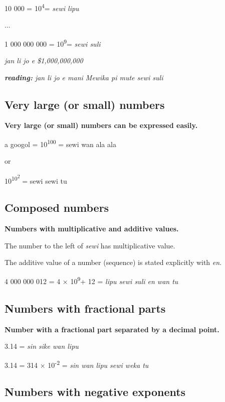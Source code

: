 \documentclass{article}
\begin{document}
	10 000 = 10\textsuperscript{4}= \emph{sewi lipu}
	
	...
	
	1 000 000 000 = 10\textsuperscript{9}= \emph{sewi suli}
	
\vspace {12 pt}
	
	\emph{jan li jo e \$1,000,000,000}
	
	\emph{\textbf{reading:} jan li jo e mani Mewika pi mute sewi suli}
	
\subsection{Very large (or small) numbers}

   \textbf{ Very large (or small) numbers can be expressed easily.}
    
    \vspace {6 pt}
	
	a googol = 10\textsuperscript{100} = sewi wan ala ala 
	
	or 
	
	10\textsuperscript{10\textsuperscript{2}} = sewi sewi tu
	
	\subsection{Composed numbers}
	
	\textbf{Numbers with multiplicative and additive values.}
	
	\vspace {6 pt}
	
	The number to the left of \emph{sewi} has multiplicative value.
	
	The additive value of a number (sequence) is stated explicitly with
	\emph{en}.
   \vspace {6 pt}
   	
	4 000 000 012 = 4 × 10\textsuperscript{9}+ 12 = \emph{lipu sewi suli en
		wan tu}
	
	\subsection{Numbers with fractional parts}
	
	\textbf{Number with a fractional part separated by a decimal point.}
	
	3.14 = \emph{sin sike wan lipu}
	
	3.14 = 314 × 10\textsuperscript{-2} = \emph{sin wan lipu sewi weka tu}
	
	\subsection{Numbers with negative exponents}
	
\end{document}
